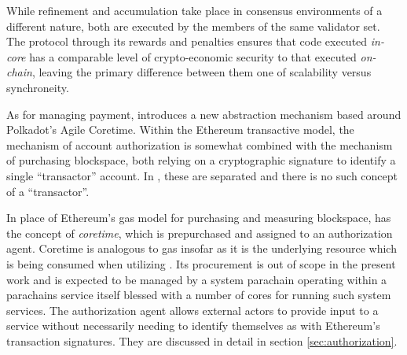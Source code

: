 While refinement and accumulation take place in consensus environments of a different nature, both are executed by the members of the same validator set. The \Jam protocol through its rewards and penalties ensures that code executed \emph{in-core} has a comparable level of crypto-economic security to that executed \emph{on-chain}, leaving the primary difference between them one of scalability versus synchroneity.

As for managing payment, \Jam introduces a new abstraction mechanism based around Polkadot's Agile Coretime. Within the Ethereum transactive model, the mechanism of account authorization is somewhat combined with the mechanism of purchasing blockspace, both relying on a cryptographic signature to identify a single ``transactor'' account. In \Jam, these are separated and there is no such concept of a ``transactor''.

In place of Ethereum's gas model for purchasing and measuring blockspace, \Jam has the concept of \emph{coretime}, which is prepurchased and assigned to an authorization agent. Coretime is analogous to gas insofar as it is the underlying resource which is being consumed when utilizing \Jam. Its procurement is out of scope in the present work and is expected to be managed by a system parachain operating within a parachains service itself blessed with a number of cores for running such system services. The authorization agent allows external actors to provide input to a service without necessarily needing to identify themselves as with Ethereum's transaction signatures. They are discussed in detail in section \ref{sec:authorization}.
